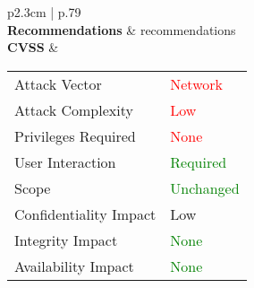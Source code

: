 \begin{longtable}[l]{p{2.3cm} | p{.79\linewidth}}
    \\
    \textbf{Recommen\-dations} & recommendations \\ \hline
    \textbf{CVSS} &
        \begin{tabular}[t]{@{}l | l}
            Attack Vector           & \textcolor{red}{Network} \\
            Attack Complexity       & \textcolor{red}{Low} \\
            Privileges Required     & \textcolor{red}{None} \\
            User Interaction        & \textcolor{Green}{Required} \\
            Scope                   & \textcolor{Green}{Unchanged} \\
            Confidentiality Impact  & \textcolor{BurntOrange}{Low} \\
            Integrity Impact        & \textcolor{Green}{None} \\
            Availability Impact     & \textcolor{Green}{None}
        \end{tabular}
    \\
    \hline
\end{longtable}
\clearpage

